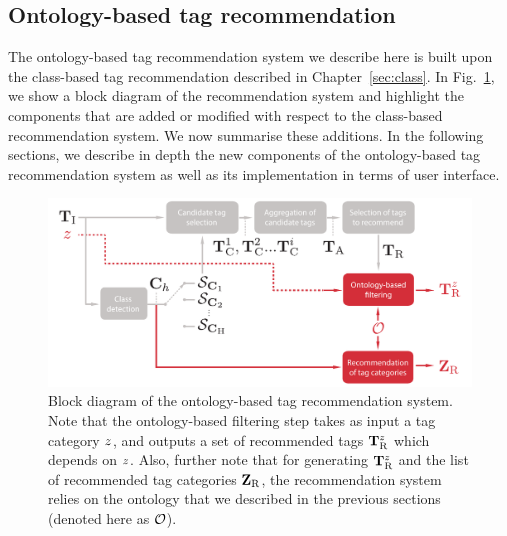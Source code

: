 

\subsection{Ontology-based tag recommendation}
\label{sec:ontology:tag_recommendation}

The ontology-based tag recommendation system we describe here is built upon the class-based tag recommendation described in Chapter~\ref{sec:class}.
In Fig.~\ref{ontology:fig:diagram}, we show a block diagram of the recommendation system and highlight the components that are added or modified with respect to the class-based recommendation system. 
We now summarise these additions. 
In the following sections, we describe in depth the new components of the ontology-based tag recommendation system as well as its implementation in terms of user interface.

\begin{figure}
  \centering
  \includegraphics[width=1.0\columnwidth]{ch06_ontology/pics/recommendation_diagram.pdf}
  \caption[Block diagram of the ontology-based tag recommendation system]{Block diagram of the ontology-based tag recommendation system. Note that the ontology-based filtering step takes as input a tag category $z$, and outputs a set of recommended tags $\mathbf{T}_{\text{R}}^z$ which depends on $z$. Also, further note that for generating $\mathbf{T}_{\text{R}}^z$ and the list of recommended tag categories $\mathbf{Z}_\text{R}$, the recommendation system relies on the ontology that we described in the previous sections (denoted here as $\mathcal{O}$). }
  \label{ontology:fig:diagram}
\end{figure}

